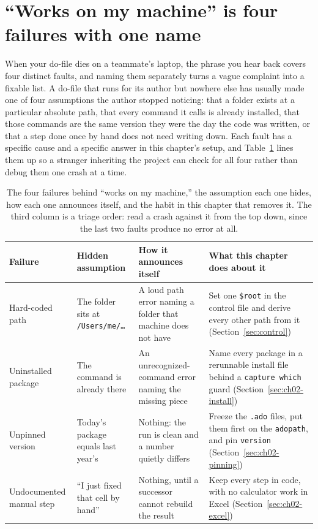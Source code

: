 \section{\enquote{Works on my machine} is four failures with one name}\label{sec:ch02-worksonmine}
When your do-file dies on a teammate's laptop, the phrase you hear back covers four distinct faults, and naming them separately turns a vague complaint into a fixable list. A do-file that runs for its author but nowhere else has usually made one of four assumptions the author stopped noticing: that a folder exists at a particular absolute path, that every command it calls is already installed, that those commands are the same version they were the day the code was written, or that a step done once by hand does not need writing down. Each fault has a specific cause and a specific answer in this chapter's setup, and Table~\ref{tab:ch02-worksonmine} lines them up so a stranger inheriting the project can check for all four rather than debug them one crash at a time.

\begin{table}[htbp]
\centering
\footnotesize
\caption[The four ``works on my machine'' failures]{The four failures behind \enquote{works on my machine,} the assumption each one hides, how each one announces itself, and the habit in this chapter that removes it. The third column is a triage order: read a crash against it from the top down, since the last two faults produce no error at all.}
\label{tab:ch02-worksonmine}
\footnotesize
\begin{tabular}{@{}p{2.4cm}p{3.3cm}p{4.0cm}p{5.0cm}@{}}
\hline
Failure & Hidden assumption & How it announces itself & What this chapter does about it \\
\hline
Hard-coded path & The folder sits at \texttt{/Users/me/\dots} & A loud path error naming a folder that machine does not have & Set one \texttt{\$root} in the control file and derive every other path from it (Section~\ref{sec:control}) \\
Uninstalled package & The command is already there & An unrecognized-command error naming the missing piece & Name every package in a rerunnable install file behind a \texttt{capture which} guard (Section~\ref{sec:ch02-install}) \\
Unpinned version & Today's package equals last year's & Nothing: the run is clean and a number quietly differs & Freeze the \texttt{.ado} files, put them first on the \texttt{adopath}, and pin \texttt{version} (Section~\ref{sec:ch02-pinning}) \\
Undocumented manual step & \enquote{I just fixed that cell by hand} & Nothing, until a successor cannot rebuild the result & Keep every step in code, with no calculator work in Excel (Section~\ref{sec:ch02-excel}) \\
\hline
\end{tabular}
\end{table}

